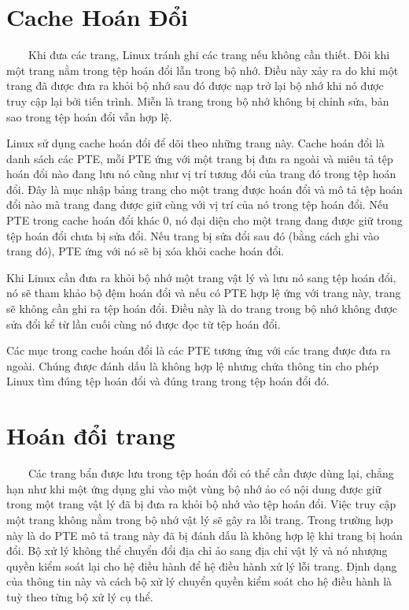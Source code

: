 \documentclass{article}
\begin{document}
\section{Cache Hoán Đổi}

~~~~Khi đưa các trang, Linux tránh ghi các trang nếu không cần thiết. Đôi khi một trang nằm trong tệp hoán đổi lẫn trong bộ nhớ. Điều này xảy ra do khi một trang đã được đưa ra khỏi bộ nhớ sau đó được nạp trở lại bộ nhớ khi nó được truy cập lại bởi tiến trình. Miễn là trang trong bộ nhớ không bị chỉnh sửa, bản sao trong tệp hoán đổi vẫn hợp lệ.\vspace{1em}

Linux sử dụng cache hoán đổi để dõi theo những trang này. Cache hoán đổi là danh sách các PTE, mỗi PTE ứng với một trang bị đưa ra ngoài và miêu tả tệp hoán đổi nào đang lưu nó cũng như vị trí tương đối của trang đó trong tệp hoán đổi. Đây là mục nhập bảng trang cho một trang được hoán đổi và mô tả tệp hoán đổi nào mà trang đang được giữ cùng với vị trí của nó trong tệp hoán đổi. Nếu PTE trong cache hoán đổi khác 0, nó đại diện cho một trang đang được giữ trong tệp hoán đổi chưa bị sửa đổi. Nếu trang bị sửa đổi sau đó (bằng cách ghi vào trang đó), PTE ứng với nó sẽ bị xóa khỏi cache hoán đổi.\vspace{1em}

Khi Linux cần đưa ra khỏi bộ nhớ một trang vật lý và lưu nó sang tệp hoán đổi, nó sẽ tham khảo bộ đệm hoán đổi và nếu có PTE hợp lệ ứng với trang này, trang sẽ không cần ghi ra tệp hoán đổi. Điều này là do trang trong bộ nhớ không được sửa đổi kể từ lần cuối cùng nó được đọc từ tệp hoán đổi.\vspace{1em}

Các mục trong cache hoán đổi là các PTE tương ứng với các trang được đưa ra ngoài. Chúng được đánh dấu là không hợp lệ nhưng chứa thông tin cho phép Linux tìm đúng tệp hoán đổi và đúng trang trong tệp hoán đổi đó.

\section{Hoán đổi trang}

~~~~Các trang bẩn được lưu trong tệp hoán đổi có thể cần được dùng lại, chẳng hạn như khi một ứng dụng ghi vào một vùng bộ nhớ ảo có nội dung được giữ trong một trang vật lý đã bị đưa ra khỏi bộ nhớ vào tệp hoán đổi. Việc truy cập một trang không nằm trong bộ nhớ vật lý sẽ gây ra lỗi trang. Trong trường hợp này là do PTE mô tả trang này đã bị đánh dấu là không hợp lệ khi trang bị hoán đổi. Bộ xử lý không thể chuyển đổi địa chỉ ảo sang địa chỉ vật lý và nó nhượng quyền kiểm soát lại cho hệ điều hành để hệ điều hành xử lý lỗi trang. Định dạng của thông tin này và cách bộ xử lý chuyển quyền kiểm soát cho hệ điều hành là tuỳ theo từng bộ xử lý cụ thể.\vspace{1em}
\end{document}
